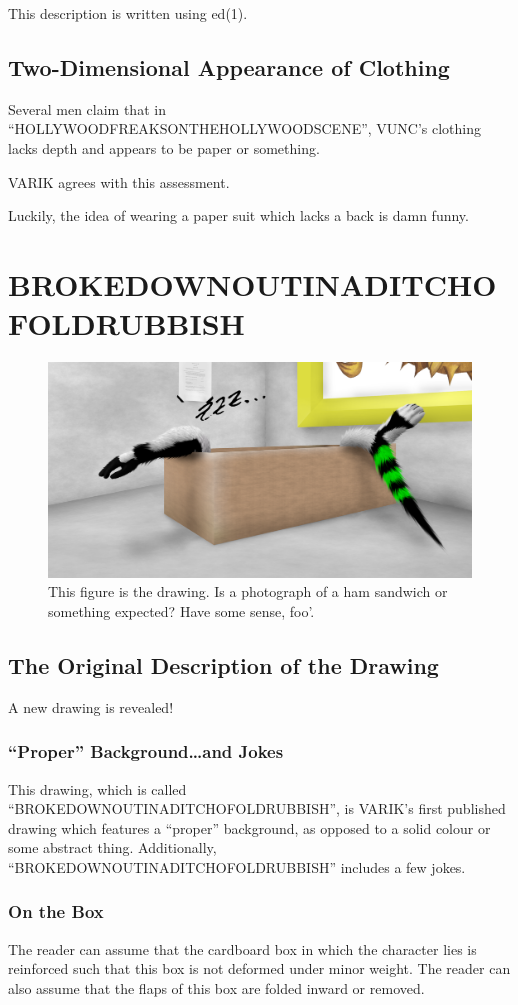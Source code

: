 \documentclass{report}
\begin{document}
This description is written using ed(1).
\section{Two-Dimensional Appearance of Clothing}
Several men claim that in ``HOLLYWOODFREAKSONTHEHOLLYWOODSCENE'', VUNC's clothing lacks depth and appears to be paper or something.

VARIK agrees with this assessment.

Luckily, the idea of wearing a paper suit which lacks a back is damn funny.
\chapter{BROKEDOWNOUTINADITCHOFOLDRUBBISH}
\begin{figure}[ht]
	\centering
	\includegraphics[width=\textwidth]{brokedownoutinaditchofoldrubbish/brokedownoutinaditchofoldrubbish.png}
	\caption[center]{This figure is the drawing.  Is a photograph of a ham sandwich or something expected?  Have some sense, foo'.}
\end{figure}
\section{The Original Description of the Drawing}
A new drawing is revealed!

\subsection{``Proper'' Background\ldots and Jokes}
This drawing, which is called ``BROKEDOWNOUTINADITCHOFOLDRUBBISH'', is VARIK's first published drawing which features a ``proper'' background, as opposed to a solid colour or some abstract thing.  Additionally, ``BROKEDOWNOUTINADITCHOFOLDRUBBISH'' includes a few jokes.

\subsection{On the Box}
The reader can assume that the cardboard box in which the character lies is reinforced such that this box is not deformed under minor weight.  The reader can also assume that the flaps of this box are folded inward or removed.
\end{document}
